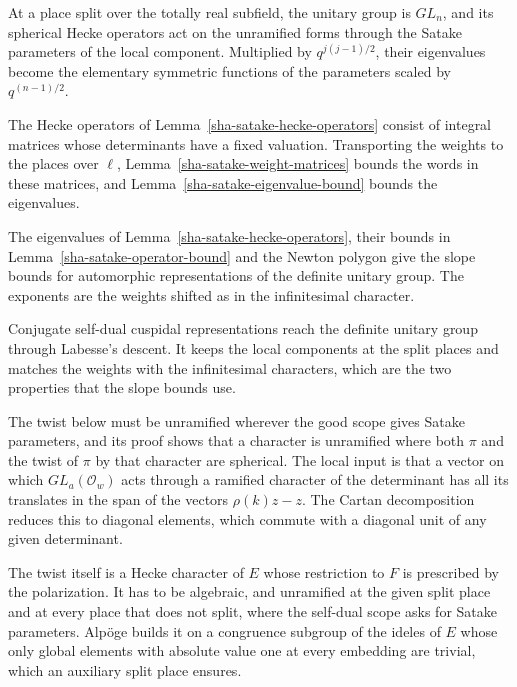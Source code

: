 At a place split over the totally real subfield, the unitary group is $GL_n$, and its spherical Hecke operators act on the unramified forms through the Satake parameters of the local component. Multiplied by $q^{j(j-1)/2}$, their eigenvalues become the elementary symmetric functions of the parameters scaled by $q^{(n-1)/2}$.

The Hecke operators of Lemma~\ref{sha-satake-hecke-operators} consist of integral matrices whose determinants have a fixed valuation. Transporting the weights to the places over $\ell$, Lemma~\ref{sha-satake-weight-matrices} bounds the words in these matrices, and Lemma~\ref{sha-satake-eigenvalue-bound} bounds the eigenvalues.

The eigenvalues of Lemma~\ref{sha-satake-hecke-operators}, their bounds in Lemma~\ref{sha-satake-operator-bound} and the Newton polygon give the slope bounds for automorphic representations of the definite unitary group. The exponents are the weights shifted as in the infinitesimal character.

Conjugate self-dual cuspidal representations reach the definite unitary group through Labesse's descent. It keeps the local components at the split places and matches the weights with the infinitesimal characters, which are the two properties that the slope bounds use.

The twist below must be unramified wherever the good scope gives Satake parameters, and its proof shows that a character is unramified where both $\pi$ and the twist of $\pi$ by that character are spherical. The local input is that a vector on which $GL_a(\mathcal O_w)$ acts through a ramified character of the determinant has all its translates in the span of the vectors $\rho(k)z-z$. The Cartan decomposition reduces this to diagonal elements, which commute with a diagonal unit of any given determinant.

The twist itself is a Hecke character of $E$ whose restriction to $F$ is prescribed by the polarization. It has to be algebraic, and unramified at the given split place and at every place that does not split, where the self-dual scope asks for Satake parameters. Alpöge builds it on a congruence subgroup of the ideles of $E$ whose only global elements with absolute value one at every embedding are trivial, which an auxiliary split place ensures.

